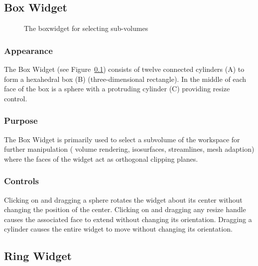 \subsection{Box Widget}
\label{sec:view-boxwidget} 

\begin{figure}[htb]
  \begin{makeimage}
  \end{makeimage}
  \boxwidget
  \caption{\label{fig:boxwidget} The boxwidget for selecting sub-volumes}
\end{figure}

\subsubsection{Appearance} The Box
Widget (see Figure~\ref{sec:view-boxwidget}) consists of twelve 
connected cylinders (A) to form a hexahedral box (B) (three-dimensional
rectangle).  In the middle of each face of the box is a sphere with a protruding cylinder (C) providing resize control.

\subsubsection{Purpose} The Box Widget is primarily used to select a
subvolume of the workspace for further manipulation (\eg{} volume
rendering, isosurfaces, streamlines, mesh adaption) where the faces of the
widget act as orthogonal clipping planes.

\subsubsection{Controls} Clicking on and dragging a sphere rotates
the widget about its center without changing the position of the center.
Clicking on and dragging any resize handle
causes the associated face to extend without changing its orientation.
Dragging a cylinder causes the entire widget to move without changing its
orientation.

\subsection{Ring Widget}
\label{sec:view-ringwidget} 

